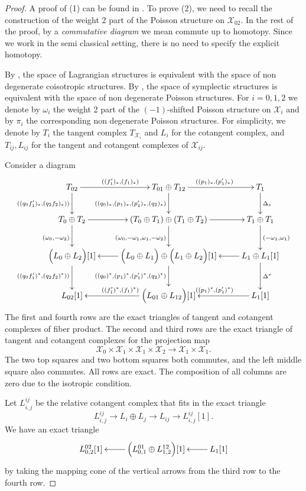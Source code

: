 \documentclass[reqno]{amsart}
\theoremstyle{definition}
\theoremstyle{remark}
\newcommand{\sX}{\mathscr{X}}
\numberwithin{equation}{section}
\begin{document}
\begin{proof}
A proof of (1) can be found in \cite[Theorem 4.4]{Ca14}. To prove (2), we need to recall the construction of the weight 2 part of the Poisson structure on $\sX_{02}$.  In the rest of the proof, by a \emph{commutative diagram} we mean commute up to homotopy. Since we work in the semi classical setting, there is no need to specify the explicit homotopy.

By \cite[Theorem 4.22]{MS2}, the space of Lagrangian structures is equivalent with the space of non degenerate coisotropic structures. By \cite[Theorem 4.12]{MS2}, the space of symplectic structures is equivalent with the space of non degenerate Poisson structures. For $i=0,1,2$ we denote by $\omega_i$ the weight 2 part of the $(-1)$-shifted Poisson structure on $\sX_i$ and by $\pi_i$ the corresponding non degenerate Poisson structures. For simplicity, we denote by $T_i$ the tangent complex $T_{\sX_i}$ and $L_i$ for the cotangent complex, and $T_{ij}, L_{ij}$ for the tangent and cotangent complexes of $\sX_{ij}$. 

Consider a diagram
\[
\xymatrix{
&T_{02}\ar[r]^{((f'_1)_*,(f_1)_*)}\ar[d]_{((q_0f'_1)_*, (q_2f_2)_*))}  & T_{01}\oplus T_{12}\ar[d]_{((q_0)_*,(p_1)_*,(p'_1)_*,(q_2)_*)} \ar[r]^{((p_1)_*,(p'_1)_*)} & T_1\ar[d]^{\Delta_*}\\
&T_0\oplus T_2\ar[r]\ar[d]_{(\omega_0,-\omega_2)} & (T_0\oplus T_1)\oplus (T_1\oplus T_2)\ar[r]\ar[d]_{(\omega_0,-\omega_1,\omega_1,-\omega_2)}& T_1\oplus 
T_1\ar[d]^{(-\omega_1,\omega_1)}\\ 
&\Big(L_0\oplus L_2\Big)[1]\ar[d]_{((q_0f'_1)^*, (q_2f_2)^*))} & \Big(L_0\oplus L_1\Big)\oplus \Big(L_1\oplus L_2\Big)[1]\ar[l]\ar[d]_{((q_0)^*,(p_1)^*,(p'_1)^*,(q_2)^*)}  & L_1\oplus L_1[1]\ar[l]\ar[d]^{\Delta^*}\\
&L_{02}[1] & \Big(L_{01}\oplus L_{12}\Big)[1]\ar[l]_{((f'_1)^*,(f_1)^*)}  & L_1[1]  \ar[l]_{((p_1)^*,(p'_1)^*)}\\
}
\]
The first and fourth rows are the exact triangles of tangent and cotangent complexes of fiber product.
The second and third rows are the exact triangle of tangent and cotangent complexes for the projection map 
\[
\sX_0\times \sX_1\times \sX_1\times \sX_2\to \sX_1\times\sX_1.
\]
The two top squares and two bottom squares both commutes, and the left middle square also commutes. All rows are exact. The composition of all columns are zero due to the isotropic condition.

Let $L_{i,j}^{ij}$ be the relative cotangent complex that fits in the exact triangle
\[
L_{i,j}^{ij}\to L_{i}\oplus L_j\to L_{ij}\to L_{i,j}^{ij}[1].
\]  We have an exact triangle
\[\xymatrix{
L^{02}_{0,2}[1] & \Big(L_{0,1}^{01}\oplus L_{1,2}^{12}\Big)[1]\ar[l] & L_1[1]\ar[l]}
\] by taking the mapping cone of the vertical arrows from the third row to the fourth row.



\end{proof}
\end{document}
